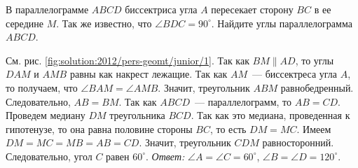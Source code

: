 В параллелограмме $ABCD$ биссектриса угла $A$ пересекает сторону $BC$ в ее
середине $M$.
Так же известно, что $\angle BDC = 90^\circ$.
Найдите углы параллелограмма $ABCD$.

%
\label{solution:2012/pers-geomt/junior/1}%
См. рис. \ref{fig:solution:2012/pers-geomt/junior/1}.
Так как $BM \parallel AD$, то углы $DAM$ и $AMB$ равны как накрест лежащие.
Так как $AM$~--- биссектреса угла $A$, то получаем, что
$\angle BAM = \angle AMB$.
Значит, треугольник $ABM$ равнобедренный.
Следовательно, $AB = BM$.
Так как $ABCD$~--- параллелограмм, то $AB = CD$.
Проведем медиану $DM$ треугольника $BCD$.
Так как это медиана, проведенная к гипотенузе, то она равна половине стороны
$BC$, то есть $DM = MC$.
Имеем $DM = MC = MB = AB = CD$.
Значит, треугольник $CDM$ равносторонний.
Следовательно, угол $C$ равен $60^\circ$.
\emph{Ответ:}
$\angle A = \angle C = 60^\circ$,
$\angle B = \angle D = 120^\circ$.

